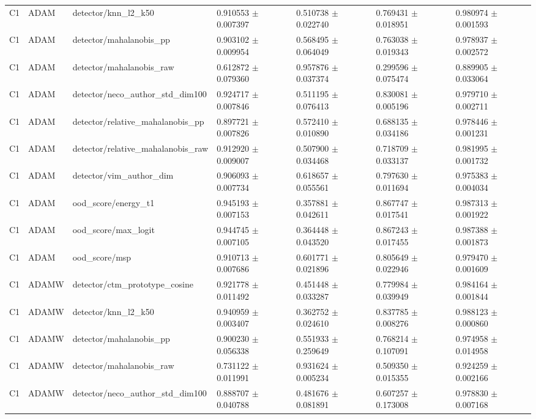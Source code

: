 \begin{longtable}{lllllll}
C1 & ADAM & detector/knn\_l2\_k50 & 0.910553 $\pm$ 0.007397 & 0.510738 $\pm$ 0.022740 & 0.769431 $\pm$ 0.018951 & 0.980974 $\pm$ 0.001593 \\
C1 & ADAM & detector/mahalanobis\_pp & 0.903102 $\pm$ 0.009954 & 0.568495 $\pm$ 0.064049 & 0.763038 $\pm$ 0.019343 & 0.978937 $\pm$ 0.002572 \\
C1 & ADAM & detector/mahalanobis\_raw & 0.612872 $\pm$ 0.079360 & 0.957876 $\pm$ 0.037374 & 0.299596 $\pm$ 0.075474 & 0.889905 $\pm$ 0.033064 \\
C1 & ADAM & detector/neco\_author\_std\_dim100 & 0.924717 $\pm$ 0.007846 & 0.511195 $\pm$ 0.076413 & 0.830081 $\pm$ 0.005196 & 0.979710 $\pm$ 0.002711 \\
C1 & ADAM & detector/relative\_mahalanobis\_pp & 0.897721 $\pm$ 0.007826 & 0.572410 $\pm$ 0.010890 & 0.688135 $\pm$ 0.034186 & 0.978446 $\pm$ 0.001231 \\
C1 & ADAM & detector/relative\_mahalanobis\_raw & 0.912920 $\pm$ 0.009007 & 0.507900 $\pm$ 0.034468 & 0.718709 $\pm$ 0.033137 & 0.981995 $\pm$ 0.001732 \\
C1 & ADAM & detector/vim\_author\_dim & 0.906093 $\pm$ 0.007734 & 0.618657 $\pm$ 0.055561 & 0.797630 $\pm$ 0.011694 & 0.975383 $\pm$ 0.004034 \\
C1 & ADAM & ood\_score/energy\_t1 & 0.945193 $\pm$ 0.007153 & 0.357881 $\pm$ 0.042611 & 0.867747 $\pm$ 0.017541 & 0.987313 $\pm$ 0.001922 \\
C1 & ADAM & ood\_score/max\_logit & 0.944745 $\pm$ 0.007105 & 0.364448 $\pm$ 0.043520 & 0.867243 $\pm$ 0.017455 & 0.987388 $\pm$ 0.001873 \\
C1 & ADAM & ood\_score/msp & 0.910713 $\pm$ 0.007686 & 0.601771 $\pm$ 0.021896 & 0.805649 $\pm$ 0.022946 & 0.979470 $\pm$ 0.001609 \\
C1 & ADAMW & detector/ctm\_prototype\_cosine & 0.921778 $\pm$ 0.011492 & 0.451448 $\pm$ 0.033287 & 0.779984 $\pm$ 0.039949 & 0.984164 $\pm$ 0.001844 \\
C1 & ADAMW & detector/knn\_l2\_k50 & 0.940959 $\pm$ 0.003407 & 0.362752 $\pm$ 0.024610 & 0.837785 $\pm$ 0.008276 & 0.988123 $\pm$ 0.000860 \\
C1 & ADAMW & detector/mahalanobis\_pp & 0.900230 $\pm$ 0.056338 & 0.551933 $\pm$ 0.259649 & 0.768214 $\pm$ 0.107091 & 0.974958 $\pm$ 0.014958 \\
C1 & ADAMW & detector/mahalanobis\_raw & 0.731122 $\pm$ 0.011991 & 0.931624 $\pm$ 0.005234 & 0.509350 $\pm$ 0.015355 & 0.924259 $\pm$ 0.002166 \\
C1 & ADAMW & detector/neco\_author\_std\_dim100 & 0.888707 $\pm$ 0.040788 & 0.481676 $\pm$ 0.081891 & 0.607257 $\pm$ 0.173008 & 0.978830 $\pm$ 0.007168 \\

\end{longtable}
